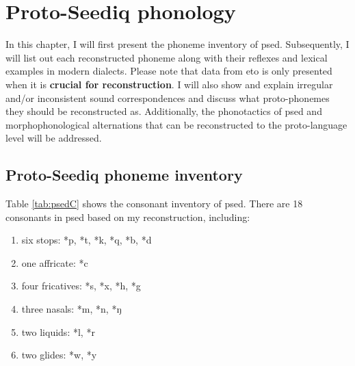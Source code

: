 \chapter{Proto-Seediq phonology}\label{ch4}

In this chapter, I will first present the phoneme inventory of \acl{psed}. Subsequently, I will list out each reconstructed phoneme along with their reflexes and lexical examples in modern dialects. Please note that data from \acl{eto} is only presented when it is \textbf{crucial for reconstruction}. I will also show and explain irregular and/or inconsistent sound correspondences and discuss what proto-phonemes they should be reconstructed as. Additionally, the phonotactics of \acl{psed} and morphophonological alternations that can be reconstructed to the proto-language level will be addressed.

\section{Proto-Seediq phoneme inventory}

Table \ref{tab:psedC} shows the consonant inventory of \acl{psed}. There are 18 consonants in \acl{psed} based on my reconstruction, including:

\begin{enumerate}[label=(\roman*), itemsep=0pt, topsep=0pt]
    \item six stops: *p, *t, *k, *q, *b, *d
    \item one affricate: *c
    \item four fricatives: *s, *x, *h, *g
    \item three nasals: *m, *n, *ŋ
    \item two liquids: *l, *r
    \item two glides: *w, *y
\end{enumerate}

